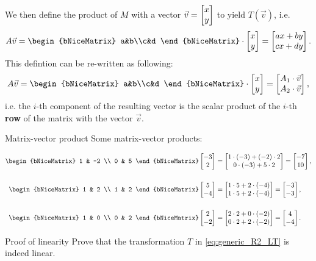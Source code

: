 We then define the product of $M$ with a vector $\vec{v}=\colvec{x;y}$ to yield $T \left( \vec{v} \right)$, i.e.
\begin{equation}
	A\vec{v} = \begin{bNiceMatrix} a&b\\c&d \end{bNiceMatrix} \cdot\colvec{x;y} = \colvec{ax+by;cx+dy}.
	\label{eq:matrix_vector_product_2x2}
\end{equation}
This defintion can be re-written as following:
\begin{equation}
	A\vec{v} = \begin{bNiceMatrix} a&b\\c&d \end{bNiceMatrix} \cdot\colvec{x;y} = \colvec{A_{1}\cdot\vec{v};A_{2}\cdot\vec{v}},
	\label{eq:matrix_vector_product_as_dot_product}
\end{equation}
i.e. the $i$-th component of the resulting vector is the scalar product of the $i$-th \textbf{row} of the matrix with the vector $\vec{v}$.

\begin{example}{Matrix-vector product}{}
	Some matrix-vector products:

	\begin{align*}
		\begin{bNiceMatrix}
			1 & -2 \\
			0 & 5
		\end{bNiceMatrix}\colvec{-3;2} &= \colvec{1\cdot(-3) + (-2)\cdot2;0\cdot(-3)+5\cdot2} = \colvec{-7;10},\\[5mm]
		\begin{bNiceMatrix}
			1 & 2 \\
			1 & 2
		\end{bNiceMatrix}\colvec{5;-4} &= \colvec{1\cdot5+2\cdot(-4);1\cdot5+2\cdot(-4)} = \colvec{-3;-3},\\[5mm]
		\begin{bNiceMatrix}
			1 & 0 \\
			0 & 2
		\end{bNiceMatrix}\colvec{2;-2} &= \colvec{2\cdot2+0\cdot(-2);0\cdot2+2\cdot(-2)} = \colvec{4;-4}.
	\end{align*}
\end{example}

\begin{challenge}{Proof of linearity}{}
	Prove that the transformation $T$ in \autoref{eq:generic_R2_LT} is indeed linear.
\end{challenge}

